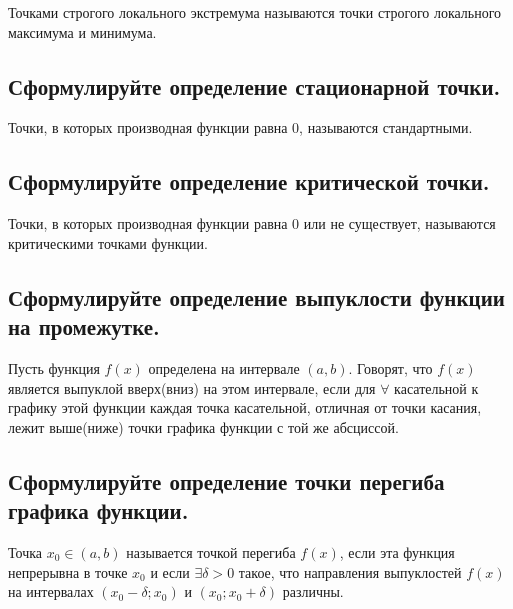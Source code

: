 Точками строгого локального экстремума называются точки строгого локального максимума и минимума.



\subsection{Сформулируйте определение стационарной точки.}

Точки, в которых производная функции равна 0, называются стандартными.



\subsection{Сформулируйте определение критической точки.}

Точки, в которых производная функции равна 0 или не существует, называются критическими точками функции.



\subsection{Сформулируйте определение выпуклости функции на промежутке.}

Пусть функция $f(x)$ определена на интервале $(a, b)$. Говорят, что $f(x)$ является выпуклой вверх(вниз) на этом интервале, если для $\forall$ касательной к графику этой функции каждая точка касательной, отличная от точки касания, лежит выше(ниже) точки графика функции с той же абсциссой.



\subsection{Сформулируйте определение точки перегиба графика функции.}

Точка $x_0 \in (a,b)$ называется точкой перегиба $f(x)$, если эта функция непрерывна в точке $x_0$ и если $\exists \delta > 0$ такое, что направления выпуклостей $f(x)$ на интервалах $(x_0-\delta; x_0)$ и $(x_0; x_0+\delta)$ различны.


